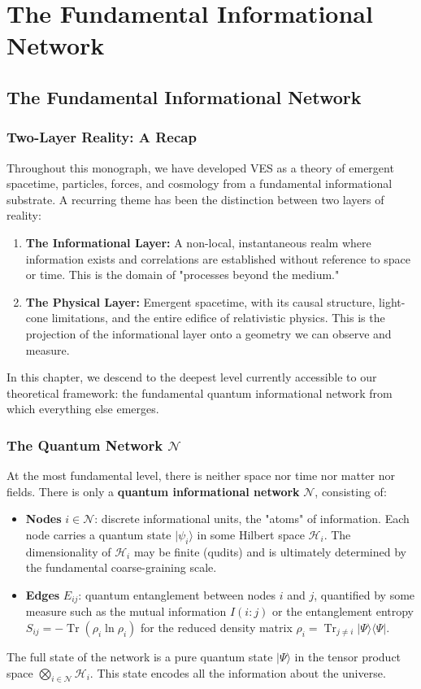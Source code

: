 \documentclass[12pt,a4paper]{book}
\newcommand{\Tr}{\operatorname{Tr}}
\begin{document}
\part{The Fundamental Informational Network}

\chapter{The Fundamental Informational Network}

\section{Two-Layer Reality: A Recap}

Throughout this monograph, we have developed VES as a theory of emergent spacetime, particles, forces, and cosmology from a fundamental informational substrate. A recurring theme has been the distinction between two layers of reality:
\begin{enumerate}
    \item \textbf{The Informational Layer:} A non-local, instantaneous realm where information exists and correlations are established without reference to space or time. This is the domain of "processes beyond the medium."
    \item \textbf{The Physical Layer:} Emergent spacetime, with its causal structure, light-cone limitations, and the entire edifice of relativistic physics. This is the projection of the informational layer onto a geometry we can observe and measure.
\end{enumerate}
In this chapter, we descend to the deepest level currently accessible to our theoretical framework: the fundamental quantum informational network from which everything else emerges.

\section{The Quantum Network $\mathcal{N}$}

At the most fundamental level, there is neither space nor time nor matter nor fields. There is only a \textbf{quantum informational network} $\mathcal{N}$, consisting of:
\begin{itemize}
    \item \textbf{Nodes} $i \in \mathcal{N}$: discrete informational units, the "atoms" of information. Each node carries a quantum state $|\psi_i\rangle$ in some Hilbert space $\mathcal{H}_i$. The dimensionality of $\mathcal{H}_i$ may be finite (qudits) and is ultimately determined by the fundamental coarse-graining scale.
    \item \textbf{Edges} $E_{ij}$: quantum entanglement between nodes $i$ and $j$, quantified by some measure such as the mutual information $I(i:j)$ or the entanglement entropy $S_{ij} = -\Tr(\rho_i \ln \rho_i)$ for the reduced density matrix $\rho_i = \Tr_{j \neq i} |\Psi\rangle\langle\Psi|$.
\end{itemize}
The full state of the network is a pure quantum state $|\Psi\rangle$ in the tensor product space $\bigotimes_{i \in \mathcal{N}} \mathcal{H}_i$. This state encodes all the information about the universe.
\end{document}

